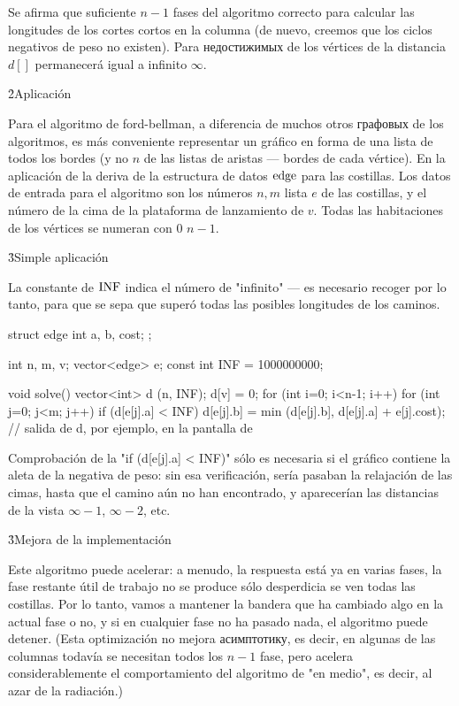 Se afirma que suficiente $n-1$ fases del algoritmo correcto para calcular las longitudes de los cortes cortos en la columna (de nuevo, creemos que los ciclos negativos de peso no existen). Para недостижимых de los vértices de la distancia $d[]$ permanecerá igual a infinito $\infty$.


\h2{Aplicación}

Para el algoritmo de ford-bellman, a diferencia de muchos otros графовых de los algoritmos, es más conveniente representar un gráfico en forma de una lista de todos los bordes (y no $n$ de las listas de aristas --- bordes de cada vértice). En la aplicación de la deriva de la estructura de datos $\rm edge$ para las costillas. Los datos de entrada para el algoritmo son los números $n, m$ lista $e$ de las costillas, y el número de la cima de la plataforma de lanzamiento de $v$. Todas las habitaciones de los vértices se numeran con $0$ $n-1$.

\h3{Simple aplicación}

La constante de $\rm INF$ indica el número de "infinito" --- es necesario recoger por lo tanto, para que se sepa que superó todas las posibles longitudes de los caminos.

\code
struct edge {
int a, b, cost;
};

int n, m, v;
vector<edge> e;
const int INF = 1000000000;

void solve() {
vector<int> d (n, INF);
d[v] = 0;
for (int i=0; i<n-1; i++)
for (int j=0; j<m; j++)
if (d[e[j].a] < INF)
d[e[j].b] = min (d[e[j].b], d[e[j].a] + e[j].cost);
// salida de d, por ejemplo, en la pantalla de
}
\endcode

Comprobación de la "if (d[e[j].a] < INF)" sólo es necesaria si el gráfico contiene la aleta de la negativa de peso: sin esa verificación, sería pasaban la relajación de las cimas, hasta que el camino aún no han encontrado, y aparecerían las distancias de la vista $\infty - 1$, $\infty - 2$, etc.

\h3{Mejora de la implementación}

Este algoritmo puede acelerar: a menudo, la respuesta está ya en varias fases, la fase restante útil de trabajo no se produce sólo desperdicia se ven todas las costillas. Por lo tanto, vamos a mantener la bandera que ha cambiado algo en la actual fase o no, y si en cualquier fase no ha pasado nada, el algoritmo puede detener. (Esta optimización no mejora асимптотику, es decir, en algunas de las columnas todavía se necesitan todos los $n-1$ fase, pero acelera considerablemente el comportamiento del algoritmo de "en medio", es decir, al azar de la radiación.)

